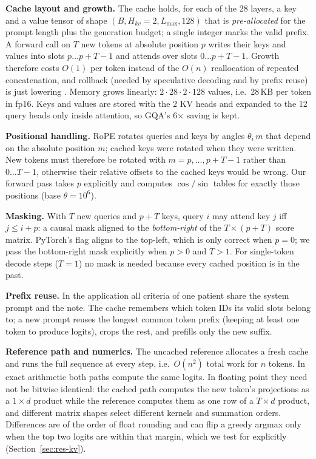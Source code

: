 \textbf{Cache layout and growth.} The cache holds, for each of the 28 layers, a key and a value
tensor of shape $(B, H_{kv}{=}2, L_{\max}, 128)$ that is \emph{pre-allocated} for the prompt length
plus the generation budget; a single integer  marks the valid prefix. A forward call on
$T$ new tokens at absolute position $p$ writes their keys and values into slots $p\ldots p{+}T{-}1$
and attends over slots $0\ldots p{+}T{-}1$. Growth therefore costs $O(1)$ per token instead of the
$O(n)$ reallocation of repeated concatenation, and rollback (needed by speculative decoding and by
prefix reuse) is just lowering . Memory grows linearly: $2 \cdot 28 \cdot 2 \cdot 128$
values, i.e.\ 28\,KB per token in fp16. Keys and values are stored with the 2 KV heads and expanded to
the 12 query heads only inside attention, so GQA's 6$\times$ saving is kept.

\textbf{Positional handling.} RoPE rotates queries and keys by angles $\theta_i\,m$ that depend on
the absolute position $m$; cached keys were rotated when they were written. New tokens must therefore
be rotated with $m = p, \ldots, p{+}T{-}1$ rather than $0\ldots T{-}1$, otherwise their relative
offsets to the cached keys would be wrong. Our forward pass takes $p$ explicitly and computes
$\cos/\sin$ tables for exactly those positions (base $\theta = 10^6$).

\textbf{Masking.} With $T$ new queries and $p+T$ keys, query $i$ may attend key $j$ iff
$j \le i + p$: a causal mask aligned to the \emph{bottom-right} of the $T\times(p{+}T)$ score matrix.
PyTorch's  flag aligns to the top-left, which is only correct when $p=0$; we pass the
bottom-right mask explicitly when $p>0$ and $T>1$. For single-token decode steps ($T=1$) no mask is
needed because every cached position is in the past.

\textbf{Prefix reuse.} In the application all criteria of one patient share the system prompt and
the note. The cache remembers which token IDs its valid slots belong to; a new prompt reuses the
longest common token prefix (keeping at least one token to produce logits), crops the rest, and
prefills only the new suffix.

\textbf{Reference path and numerics.} The uncached reference allocates a fresh cache and runs the
full sequence at every step, i.e.\ $O(n^2)$ total work for $n$ tokens. In exact arithmetic both paths
compute the same logits. In floating point they need not be bitwise identical: the cached path
computes the new token's projections as a $1\times d$ product while the reference computes them as one
row of a $T\times d$ product, and different matrix shapes select different kernels and summation
orders. Differences are of the order of float rounding and can flip a greedy argmax only when the top
two logits are within that margin, which we test for explicitly (Section~\ref{sec:res-kv}).

